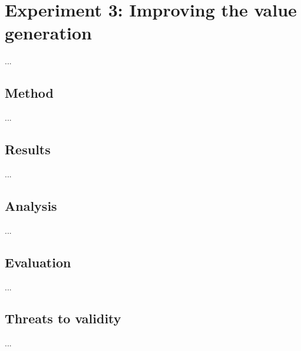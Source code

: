 \chapter{Experiment 3: Improving the value generation}
\label{cpt:experiment3}
...

\section{Method}
...

\section{Results}
...

\section{Analysis}
...

\section{Evaluation}
...

\section{Threats to validity}
...
